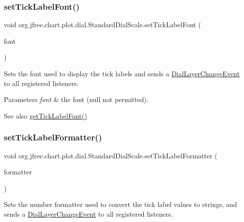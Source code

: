 \subsubsection{\texorpdfstring{set\+Tick\+Label\+Font()}{setTickLabelFont()}}
{\footnotesize\ttfamily void org.\+jfree.\+chart.\+plot.\+dial.\+Standard\+Dial\+Scale.\+set\+Tick\+Label\+Font (\begin{DoxyParamCaption}\item[{Font}]{font }\end{DoxyParamCaption})}

Sets the font used to display the tick labels and sends a \mbox{\hyperlink{classorg_1_1jfree_1_1chart_1_1plot_1_1dial_1_1_dial_layer_change_event}{Dial\+Layer\+Change\+Event}} to all registered listeners.


\begin{DoxyParams}{Parameters}
{\em font} & the font ({\ttfamily null} not permitted).\\
\hline
\end{DoxyParams}
\begin{DoxySeeAlso}{See also}
\mbox{\hyperlink{classorg_1_1jfree_1_1chart_1_1plot_1_1dial_1_1_standard_dial_scale_a5647e1d012b0291f4ad887bdbd078209}{get\+Tick\+Label\+Font()}} 
\end{DoxySeeAlso}
\mbox{\label{classorg_1_1jfree_1_1chart_1_1plot_1_1dial_1_1_standard_dial_scale_a0f777cb872c72e09fd3d769434c5dafc}} 
\subsubsection{\texorpdfstring{set\+Tick\+Label\+Formatter()}{setTickLabelFormatter()}}
{\footnotesize\ttfamily void org.\+jfree.\+chart.\+plot.\+dial.\+Standard\+Dial\+Scale.\+set\+Tick\+Label\+Formatter (\begin{DoxyParamCaption}\item[{Number\+Format}]{formatter }\end{DoxyParamCaption})}

Sets the number formatter used to convert the tick label values to strings, and sends a \mbox{\hyperlink{classorg_1_1jfree_1_1chart_1_1plot_1_1dial_1_1_dial_layer_change_event}{Dial\+Layer\+Change\+Event}} to all registered listeners.


